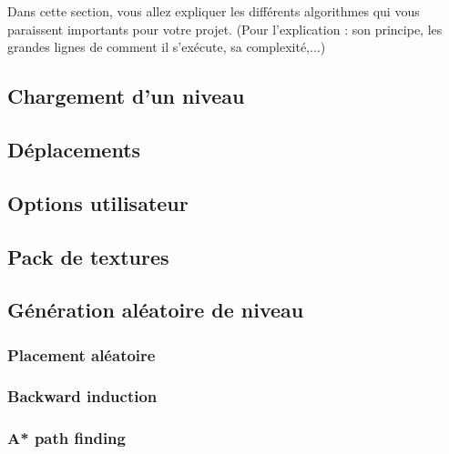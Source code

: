 \documentclass[../main.tex]{subfiles}
\begin{document}
Dans cette section, vous allez expliquer les différents algorithmes qui vous paraissent importants pour votre projet. (Pour l'explication : son principe, les grandes lignes de comment il s'exécute, sa complexité,...)

\subsection{Chargement d'un niveau}

\subsection{Déplacements}

\subsection{Options utilisateur}

\subsection{Pack de textures}

\subsection{Génération aléatoire de niveau}
\subsubsection{Placement aléatoire}
\subsubsection{Backward induction}
\subsubsection{A* path finding}
\end{document}
